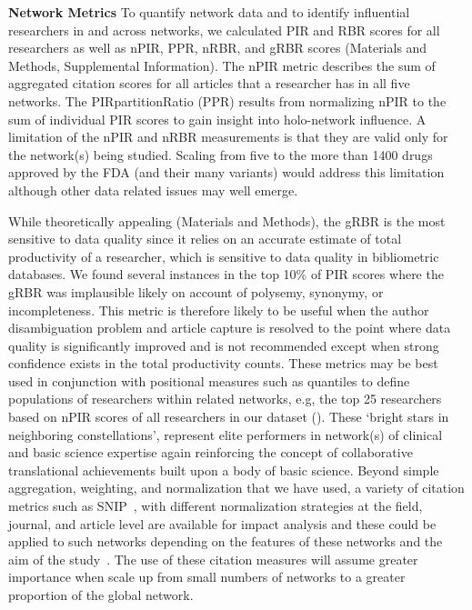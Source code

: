 \documentclass[10pt,letterpaper]{article}
\begin{document}
\textbf{Network Metrics} To quantify network data and to identify influential researchers in and across networks, we calculated PIR and RBR scores for all researchers as well as nPIR, PPR, nRBR, and gRBR scores (Materials and Methods, Supplemental Information). The nPIR metric describes the sum of aggregated citation scores for all articles that a researcher has in all five networks. The PIRpartitionRatio (PPR) results from normalizing nPIR to the sum of individual PIR scores to gain insight into holo-network influence. A limitation of the nPIR and nRBR measurements is that they are valid only for the network(s) being studied. Scaling from five to the more than 1400 drugs approved by the FDA (and their many variants) would address this limitation~\cite{bibKinch} although other data related issues may well emerge. 

While theoretically appealing (Materials and Methods), the gRBR is the most sensitive to data quality since it relies on an accurate estimate of total productivity of a researcher, which is sensitive to data quality in bibliometric databases. We found several instances in the top 10\% of PIR scores where the gRBR was implausible likely on account of polysemy, synonymy, or incompleteness. This metric is therefore likely to be useful when the author disambiguation problem and article capture is resolved to the point where data quality is significantly improved and is not recommended except when strong confidence exists in the total productivity counts. These metrics may be best used in conjunction with positional measures such as quantiles to define populations of researchers within related networks, e.g, the top 25 researchers based on nPIR scores of all researchers in our dataset (). These `bright stars in neighboring constellations', represent elite performers in network(s) of clinical and basic science expertise again reinforcing the concept of collaborative translational achievements built upon a body of basic science. Beyond simple aggregation, weighting, and normalization that we have used, a variety of citation metrics such as SNIP~\cite{bibWaltman}, with different normalization strategies at the field, journal, and article level are available for impact analysis and these could be applied to such networks depending on the features of these networks and the aim of the study~\cite{bibIoannidis}. The use of these citation measures will assume greater importance when scale up from small numbers of networks to a greater proportion of the global network.
\end{document}
